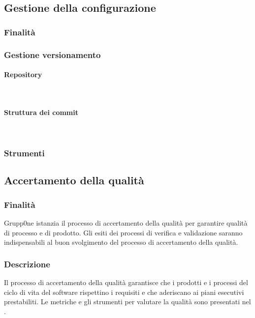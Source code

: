\documentclass[../norme-di-progetto.tex]{subfiles}
\begin{document}
\subsection{Gestione della configurazione}
\label{sub:gestione della configurazione}
\subsubsection{Finalità}
\label{subs:finalità}
\subsubsection{Gestione versionamento}
\label{subs:gestione versionamento}

\paragraph{Repository}\mbox{}\\
\label{par:repository}

\paragraph{Struttura dei commit}\mbox{}\\
\label{par:struttura dei commit}

\subsubsection{Strumenti}%
\label{subs:strumenti}
\subsection{Accertamento della qualità}
\label{sub:accertamento della qualità}

\subsubsection{Finalità}
\label{subs:finalità}
Grupp0ne istanzia il processo di accertamento della qualità per garantire qualità di processo e di prodotto. Gli esiti dei processi di verifica e validazione saranno indispensabili al buon svolgimento del processo di accertamento della qualità.
\subsubsection{Descrizione}
\label{subs:descrizione}
Il processo di accertamento della qualità garantisce che i prodotti e i processi del ciclo di vita del software rispettino i requisiti e che aderiscano ai piani esecutivi prestabiliti. Le metriche e gli strumenti per valutare la qualità sono presentati nel .
\end{document}
